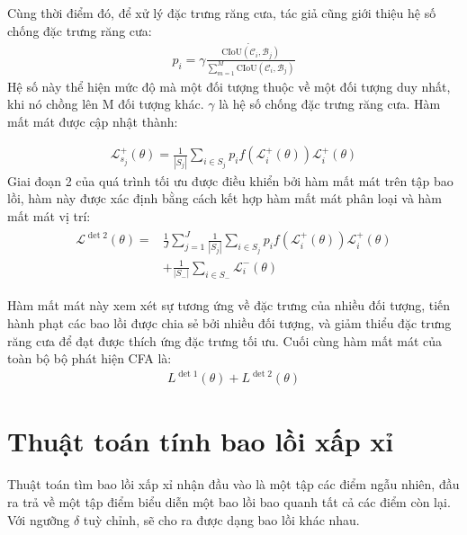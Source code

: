 \documentclass[12pt,a4paper,openany,oneside]{report}
\begin{document}
Cùng thời điểm đó, để xử lý đặc trưng răng cưa, tác giả cũng giới thiệu hệ số chống đặc trưng răng cưa:
\begin{align}\label{FAA_fomular}
	p_i = \gamma\dot{\frac{\mathrm{CIoU}(\mathcal{C}_i, \mathcal{B}_j)}{\sum_{m=1}^{M}\mathrm{CIoU}\left(\mathcal{C}_i, \mathcal{B}_j\right)}}
\end{align}
Hệ số này thể hiện mức độ mà một đối tượng thuộc về một đối tượng duy nhất, khi nó chồng lên M đối tượng khác. $\gamma$ là hệ số chống đặc trưng răng cưa.
Hàm mất mát được cập nhật thành: 

\begin{align}\label{loss_update}
	\mathcal{L}_{s_j}^{+}(\theta)=\frac{1}{\left|S_j\right|} \sum_{i \in S_j} p_i f\left(\mathcal{L}_i^{+}(\theta)\right) \mathcal{L}_i^{+}(\theta)
\end{align}
Giai đoạn 2 của quá trình tối ưu được điều khiển bởi hàm mất mát trên tập bao lồi, hàm này được xác định bằng cách kết hợp hàm mất mát phân loại và hàm mất mát vị trí:
\begin{align} \label{loss_det_2}
	\begin{aligned}
		\mathcal{L}^{\operatorname{det} 2}(\theta)= & \frac{1}{J} \sum_{j=1}^J \frac{1}{\left|S_j\right|} \sum_{i \in S_j} p_i f\left(\mathcal{L}_i^{+}(\theta)\right) \mathcal{L}_i^{+}(\theta) \\
		& +\frac{1}{\left|S_{-}\right|} \sum_{i \in S_{-}} \mathcal{L}_i^{-}(\theta)
	\end{aligned}
\end{align}

Hàm mất mát này xem xét sự tương ứng về đặc trưng của nhiều đối tượng, tiến hành phạt các bao lồi được chia sẻ bởi nhiều đối tượng, và giảm thiểu đặc trưng răng cưa để đạt được thích ứng đặc trưng tối ưu. Cuối cùng hàm mất mát của toàn bộ bộ phát hiện CFA là: 
\begin{align} \label{final_loss_CFA}
	L^{\operatorname{det} 1}(\theta)+L^{\operatorname{det} 2}(\theta)
\end{align}

\chapter{Thuật toán tính bao lồi xấp xỉ}
Thuật toán tìm bao lồi xấp xỉ nhận đầu vào là một tập các điểm ngẫu nhiên, đầu ra trả về một tập điểm biểu diễn một bao lồi bao quanh tất cả các điểm còn lại. Với ngưỡng $\delta$ tuỳ chỉnh, sẽ cho ra được dạng bao lồi khác nhau.
\end{document}

